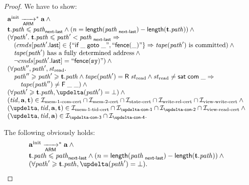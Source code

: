 \begin{proof}
  We have to show:
  \[\begin{array}{l}
    \ainit \armStepP^{*} \aT \land {} \\
    \tT.\cpath \le \cpath_{\textup{\sf next-last}} \land (n = \length(\cpath_{\textup{\sf next-last}}) - \length(\tT.\cpath)) \land {} \\
    (\forall \cpath'. \; \tT.\cpath \le \cpath' < \cpath_{\textup{\sf next-last}} \Rightarrow \\
    \quad (\Cprom[\lastInstr{\cpath'}] \in \{``\ifGotoInst{\_}{\_}", ``\fenceInst{\_}"\} \Rightarrow
             \tape(\cpath') \text{ is committed}) \land {} \\
    \quad \tape(\cpath') \text{ has a fully determined address} \land {} \\
    \quad \lnot \Cprom[\lastInstr{\cpath'}] = ``\fenceInst{\SY}") \land {} \\
    (\forall \cpath'', \cpath', \Rstate. \\
    \quad \cpath'' \ge \cpath' \ge \tT.\cpath \land \tape(\cpath') = \tapeRead{\Rstate} \land
       \Rstate \not = \tapeSatisfied{\Committed}{\_} \Rightarrow \\
    \quad \quad \tape(\cpath'') \not = \tapeFence{\_}{\_}) \land {} \\
    (\forall \cpath' \ge \tT.\cpath, \delta(\cpath') = \bot) \land {} \\
    (\tId, \aT, \tT) \in \invMemOneCERT \cap \invMemTwoCERT \cap \invStateCERT \cap \invViewRelCERT \cap \invViewWriteCERT \land {} \\
    (\delta, \tId, \aT, \tT) \in \invMemZeroCERT \cap \invDeltaDefOne \cap \invDeltaDefTwo \cap
               \invViewReadCERT \land {} \\
    (\delta, \tId, \aT) \in \invDeltaDefThree \cap \invDeltaDefFour. \\
  \end{array}\]

  The following obviously holds:
  \[\begin{array}{l}
    \ainit \armStepP^{*} \aT \land {} \\
    \tT.\cpath \le \cpath_{\textup{\sf next-last}} \land (n = \length(\cpath_{\textup{\sf next-last}}) - \length(\tT.\cpath)) \land {} \\
    (\forall \cpath' \ge \tT.\cpath, \delta(\cpath') = \bot). \\
  \end{array}\]


\end{proof}
